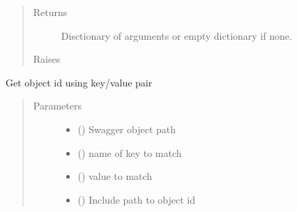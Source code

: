 \documentclass[letterpaper,10pt,english]{sphinxmanual}
\begin{document}
\begin{fulllineitems}
\begin{fulllineitems}
\begin{quote}
\begin{description}
\item[{Returns}] \leavevmode
\sphinxAtStartPar
Disctionary of arguments or empty dictionary if none.

\item[{Raises}] \leavevmode
\sphinxAtStartPar
{} \textendash{} 

\end{description}\end{quote}

\end{fulllineitems}


\begin{fulllineitems}
\label{\detokenize{b1diagnostics-class:bloxone.b1diagnostics.get_id}}
\sphinxAtStartPar
Get object id using key/value pair
\begin{quote}\begin{description}
\item[{Parameters}] \leavevmode\begin{itemize}
\item {} 
\sphinxAtStartPar
{} () \textendash{} Swagger object path

\item {} 
\sphinxAtStartPar
{} () \textendash{} name of key to match

\item {} 
\sphinxAtStartPar
{} () \textendash{} value to match

\item {} 
\sphinxAtStartPar
{} () \textendash{} Include path to object id


\end{itemize}
\end{description}
\end{quote}
\end{fulllineitems}
\end{fulllineitems}
\end{document}
